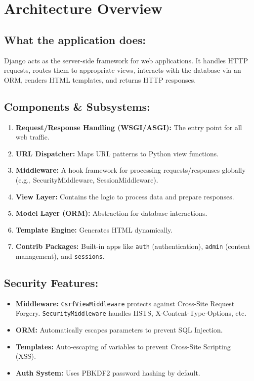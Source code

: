 \documentclass[10pt,a4paper]{article}
\begin{document}
\section*{Architecture Overview}

\subsection*{What the application does:}
Django acts as the server-side framework for web applications. It handles HTTP requests, routes them to appropriate views, interacts with the database via an ORM, renders HTML templates, and returns HTTP responses.

\subsection*{Components \& Subsystems:}
\begin{enumerate}
    \item \textbf{Request/Response Handling (WSGI/ASGI):} The entry point for all web traffic.
    \item \textbf{URL Dispatcher:} Maps URL patterns to Python view functions.
    \item \textbf{Middleware:} A hook framework for processing requests/responses globally (e.g., SecurityMiddleware, SessionMiddleware).
    \item \textbf{View Layer:} Contains the logic to process data and prepare responses.
    \item \textbf{Model Layer (ORM):} Abstraction for database interactions.
    \item \textbf{Template Engine:} Generates HTML dynamically.
    \item \textbf{Contrib Packages:} Built-in apps like \texttt{auth} (authentication), \texttt{admin} (content management), and \texttt{sessions}.
\end{enumerate}

\subsection*{Security Features:}
\begin{itemize}
    \item \textbf{Middleware:} \texttt{CsrfViewMiddleware} protects against Cross-Site Request Forgery. \texttt{SecurityMiddleware} handles HSTS, X-Content-Type-Options, etc.
    \item \textbf{ORM:} Automatically escapes parameters to prevent SQL Injection.
    \item \textbf{Templates:} Auto-escaping of variables to prevent Cross-Site Scripting (XSS).
    \item \textbf{Auth System:} Uses PBKDF2 password hashing by default.
\end{itemize}
\end{document}
